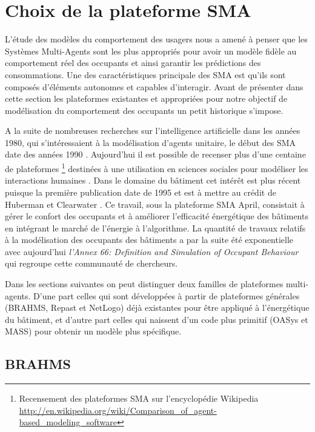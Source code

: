 \section{Choix de la plateforme SMA}

L'étude des modèles du comportement des usagers nous a amené à penser que les Systèmes Multi-Agents sont les plus appropriés pour avoir un modèle fidèle au comportement réel des occupants et ainsi garantir les prédictions des consommations. Une des caractéristiques principale des SMA est qu'ils sont composés d'éléments autonomes et capables d'interagir. Avant de présenter dans cette section les plateformes existantes et appropriées pour notre objectif de modélisation du comportement des occupants un petit historique s'impose.

A la suite de nombreuses recherches sur l'intelligence artificielle dans les années 1980, qui s'intéressaient à la modélisation d'agents unitaire, le début des SMA date des années 1990 \cite{Alonso-14}. Aujourd'hui il est possible de recenser plus d'une centaine de plateformes \footnote{Recensement des plateformes SMA sur l'encyclopédie Wikipedia \url{http://en.wikipedia.org/wiki/Comparison_of_agent-based_modeling_software}} destinées à une utilisation en sciences sociales pour modéliser les interactions humaines \cite{Bonabeau-02}. Dans le domaine du bâtiment cet intérêt est plus récent puisque la première publication date de 1995 et est à mettre au crédit de Huberman et Clearwater \cite{Huberman-95}. Ce travail, sous la plateforme SMA April, consistait à gérer le confort des occupants et à améliorer l'efficacité énergétique des bâtiments en intégrant le marché de l'énergie à l'algorithme. La quantité de travaux relatifs à la modélisation des occupants des bâtiments a par la suite été exponentielle avec aujourd'hui \textit{l'Annex 66: Definition and Simulation of Occupant Behaviour} qui regroupe cette communauté de chercheurs.

Dans les sections suivantes on peut distinguer deux familles de plateformes multi-agents. D'une part celles qui sont développées à partir de plateformes générales (BRAHMS, Repast et NetLogo) déjà existantes pour être appliqué à l'énergétique du bâtiment, et d'autre part celles qui naissent d'un code plus primitif (OASys et MASS) pour obtenir un modèle plus spécifique.

\subsection{BRAHMS}
\label{BRAHMS}

